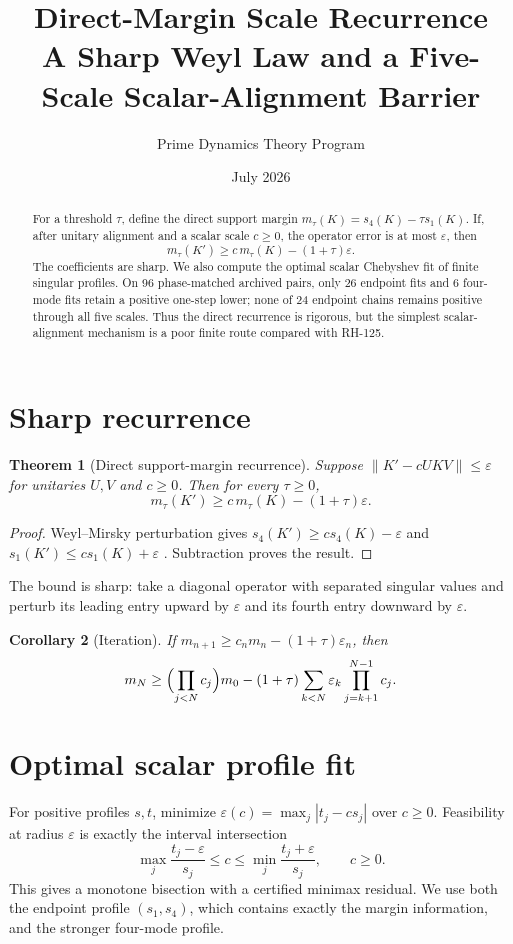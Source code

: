 \documentclass[12pt]{article}\usepackage[margin=1in]{geometry}\usepackage{amsmath,amssymb,amsthm,graphicx,natbib,microtype}\newtheorem{theorem}{Theorem}\newtheorem{corollary}[theorem]{Corollary}
\title{Direct-Margin Scale Recurrence\\\large A Sharp Weyl Law and a Five-Scale Scalar-Alignment Barrier}\author{Prime Dynamics Theory Program}\date{July 2026}
\begin{document}
\maketitle
\begin{abstract}
For a threshold $\tau$, define the direct support margin
$m_\tau(K)=s_4(K)-\tau s_1(K)$.  If, after unitary alignment and a scalar
scale $c\geq0$, the operator error is at most $\varepsilon$, then
\[
m_\tau(K')\geq c\,m_\tau(K)-(1+\tau)\varepsilon.
\]
The coefficients are sharp.  We also compute the optimal scalar Chebyshev
fit of finite singular profiles.  On 96 phase-matched archived pairs, only
26 endpoint fits and 6 four-mode fits retain a positive one-step lower; none
of 24 endpoint chains remains positive through all five scales.  Thus the
direct recurrence is rigorous, but the simplest scalar-alignment mechanism
is a poor finite route compared with RH-125.
\end{abstract}
\section{Sharp recurrence}
\begin{theorem}[Direct support-margin recurrence]\label{thm:margin}
Suppose $\|K'-cUKV\|\leq\varepsilon$ for unitaries $U,V$ and $c\geq0$.
Then for every $\tau\geq0$,
\[
m_\tau(K')\geq c\,m_\tau(K)-(1+\tau)\varepsilon.
\]
\end{theorem}
\begin{proof}
Weyl--Mirsky perturbation gives
$s_4(K')\geq cs_4(K)-\varepsilon$ and
$s_1(K')\leq cs_1(K)+\varepsilon$ \citep{HornJohnson1991}.  Subtraction
proves the result.
\end{proof}
The bound is sharp: take a diagonal operator with separated singular values
and perturb its leading entry upward by $\varepsilon$ and its fourth entry
downward by $\varepsilon$.

\begin{corollary}[Iteration]
If $m_{n+1}\geq c_nm_n-(1+\tau)\varepsilon_n$, then
\[
m_N\geq\Bigl(\prod_{j<N}c_j\Bigr)m_0-(1+\tau)
\sum_{k<N}\varepsilon_k\prod_{j=k+1}^{N-1}c_j.
\]
\end{corollary}

\section{Optimal scalar profile fit}
For positive profiles $s,t$, minimize
$\varepsilon(c)=\max_j|t_j-cs_j|$ over $c\geq0$.  Feasibility at radius
$\varepsilon$ is exactly the interval intersection
\[
\max_j\frac{t_j-\varepsilon}{s_j}\leq c\leq
\min_j\frac{t_j+\varepsilon}{s_j},\qquad c\geq0.
\]
This gives a monotone bisection with a certified minimax residual.  We use
both the endpoint profile $(s_1,s_4)$, which contains exactly the margin
information, and the stronger four-mode profile.
\end{document}
